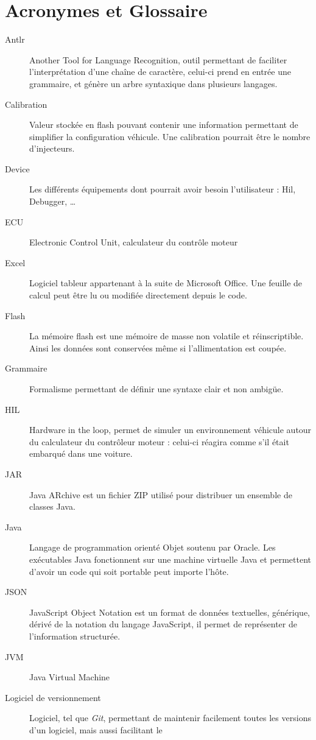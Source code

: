 \chapter{Acronymes et Glossaire}
\begin{description}
\item[Antlr] Another Tool for Language Recognition, outil permettant de faciliter l'interprétation d'une chaîne de caractère, celui-ci prend en entrée une
	grammaire, et génère un arbre syntaxique dans plusieurs langages.
\item[Calibration] Valeur stockée en flash pouvant contenir une information permettant de simplifier la configuration véhicule. Une
	calibration pourrait être le nombre d'injecteurs.
\item[Device] Les différents équipements dont pourrait avoir besoin l'utilisateur : Hil, Debugger, \ldots 
\item[ECU] Electronic Control Unit, calculateur du contrôle moteur
\item[Excel] Logiciel tableur appartenant à la suite de Microsoft Office\textregistered. Une feuille de calcul peut être lu ou modifiée directement depuis le code.
\item[Flash] La mémoire flash est une mémoire de masse non volatile et réinscriptible. Ainsi les données sont conservées même si
	l'allimentation est coupée.
\item[Grammaire] Formalisme permettant de définir une syntaxe clair et non ambigüe.
\item[HIL] Hardware in the loop, permet de simuler un environnement véhicule autour du calculateur du contrôleur moteur : celui-ci réagira comme s'il était embarqué dans une voiture.
\item[JAR] Java ARchive est un fichier ZIP utilisé pour distribuer un ensemble de classes Java.
\item[Java] Langage de programmation orienté Objet soutenu par Oracle. Les exécutables Java fonctionnent sur une machine virtuelle Java et permettent d'avoir un
	code qui soit portable peut importe l'hôte.
\item[JSON] JavaScript Object Notation est un format de données textuelles, générique, dérivé de la notation du langage JavaScript, il permet de représenter de
	l'information structurée.
\item[JVM] Java Virtual Machine
\item[Logiciel de versionnement] Logiciel, tel que \textit{Git}, permettant de maintenir facilement toutes les versions d'un logiciel, mais aussi facilitant le

\end{description}
